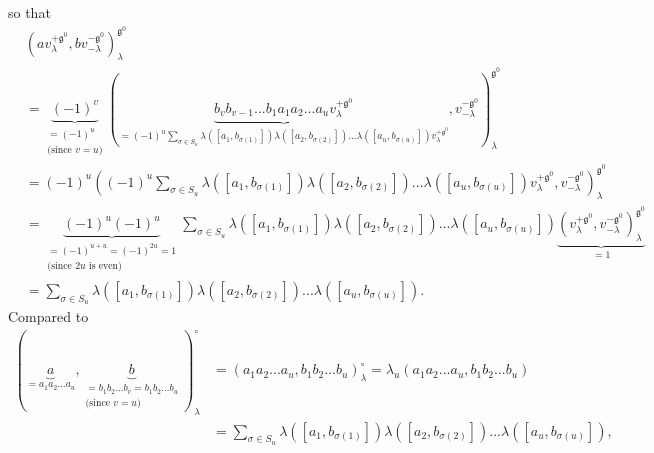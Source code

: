 \documentclass[etingof-lie.tex]{subfiles}
\begin{document}
so that%
\begin{align*}
&  \left(  av_{\lambda}^{+\mathfrak{g}^{0}},bv_{-\lambda}^{-\mathfrak{g}^{0}%
}\right)  _{\lambda}^{\mathfrak{g}^{0}}\\
&  =\underbrace{\left(  -1\right)  ^{v}}_{\substack{=\left(  -1\right)
^{u}\\\text{(since }v=u\text{)}}}\left(  \underbrace{b_{v}b_{v-1}...b_{1}%
a_{1}a_{2}...a_{u}v_{\lambda}^{+\mathfrak{g}^{0}}}_{=\left(  -1\right)
^{u}\sum\limits_{\sigma\in S_{u}}\lambda\left(  \left[  a_{1},b_{\sigma\left(
1\right)  }\right]  \right)  \lambda\left(  \left[  a_{2},b_{\sigma\left(
2\right)  }\right]  \right)  ...\lambda\left(  \left[  a_{u},b_{\sigma\left(
u\right)  }\right]  \right)  v_{\lambda}^{+\mathfrak{g}^{0}}},v_{-\lambda
}^{-\mathfrak{g}^{0}}\right)  _{\lambda}^{\mathfrak{g}^{0}}\\
&  =\left(  -1\right)  ^{u}\left(  \left(  -1\right)  ^{u}\sum\limits_{\sigma
\in S_{u}}\lambda\left(  \left[  a_{1},b_{\sigma\left(  1\right)  }\right]
\right)  \lambda\left(  \left[  a_{2},b_{\sigma\left(  2\right)  }\right]
\right)  ...\lambda\left(  \left[  a_{u},b_{\sigma\left(  u\right)  }\right]
\right)  v_{\lambda}^{+\mathfrak{g}^{0}},v_{-\lambda}^{-\mathfrak{g}^{0}%
}\right)  _{\lambda}^{\mathfrak{g}^{0}}\\
&  =\underbrace{\left(  -1\right)  ^{u}\left(  -1\right)  ^{u}}%
_{\substack{=\left(  -1\right)  ^{u+u}=\left(  -1\right)  ^{2u}%
=1\\\text{(since }2u\text{ is even)}}}\sum\limits_{\sigma\in S_{u}}%
\lambda\left(  \left[  a_{1},b_{\sigma\left(  1\right)  }\right]  \right)
\lambda\left(  \left[  a_{2},b_{\sigma\left(  2\right)  }\right]  \right)
...\lambda\left(  \left[  a_{u},b_{\sigma\left(  u\right)  }\right]  \right)
\underbrace{\left(  v_{\lambda}^{+\mathfrak{g}^{0}},v_{-\lambda}%
^{-\mathfrak{g}^{0}}\right)  _{\lambda}^{\mathfrak{g}^{0}}}_{=1}\\
&  =\sum\limits_{\sigma\in S_{u}}\lambda\left(  \left[  a_{1},b_{\sigma\left(
1\right)  }\right]  \right)  \lambda\left(  \left[  a_{2},b_{\sigma\left(
2\right)  }\right]  \right)  ...\lambda\left(  \left[  a_{u},b_{\sigma\left(
u\right)  }\right]  \right)  .
\end{align*}
Compared to%
\begin{align*}
\left(  \underbrace{a}_{=a_{1}a_{2}...a_{u}},\underbrace{b}_{\substack{=b_{1}%
b_{2}...b_{v}=b_{1}b_{2}...b_{u}\\\text{(since }v=u\text{)}}}\right)
_{\lambda}^{\circ}  &  =\left(  a_{1}a_{2}...a_{u},b_{1}b_{2}...b_{u}\right)
_{\lambda}^{\circ}=\lambda_{u}\left(  a_{1}a_{2}...a_{u},b_{1}b_{2}%
...b_{u}\right) \\
&  =\sum\limits_{\sigma\in S_{u}}\lambda\left(  \left[  a_{1},b_{\sigma\left(
1\right)  }\right]  \right)  \lambda\left(  \left[  a_{2},b_{\sigma\left(
2\right)  }\right]  \right)  ...\lambda\left(  \left[  a_{u},b_{\sigma\left(
u\right)  }\right]  \right)  ,
\end{align*}
\end{document}
